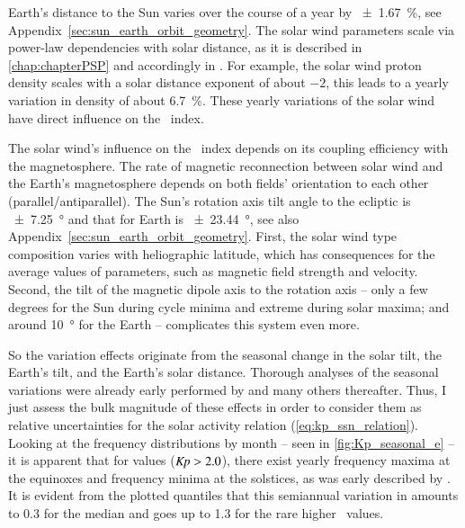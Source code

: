 Earth's distance to the Sun varies over the course of a year by \SI{+-1.67}{\percent}, see Appendix~\ref{sec:sun_earth_orbit_geometry}. The solar wind parameters scale via power-law dependencies with solar distance, as it is described in \autoref{chap:chapterPSP} and accordingly in \citet{Venzmer2018}. For example, the solar wind proton density scales with a solar distance exponent of about $-2$, this leads to a yearly variation in density of about \SI{6.7}{\percent}. These yearly variations of the solar wind have direct influence on the \Kp~index.

The solar wind's influence on the \Kp~index depends on its coupling efficiency with the magnetosphere. The rate of magnetic reconnection between solar wind and the Earth's magnetosphere depends on both fields' orientation to each other (parallel/antiparallel). The Sun's rotation axis tilt angle to the ecliptic is \SI{+-7.25}{\degree} and that for Earth is \SI{+-23.44}{\degree}, see also Appendix~\ref{sec:sun_earth_orbit_geometry}. First, the solar wind type composition varies with heliographic latitude, which has consequences for the average values of parameters, such as magnetic field strength and velocity. Second, the tilt of the magnetic dipole axis to the rotation axis -- only a few degrees for the Sun during cycle minima and extreme during solar maxima; and around \SI{10}{\degree} for the Earth -- complicates this system even more.

So the \Kp{} variation effects originate from the seasonal change in the solar tilt, the Earth's tilt, and the Earth's solar distance. Thorough analyses of the seasonal variations were already early performed by \citet{Cortie1912} and many others thereafter. Thus, I just assess the bulk magnitude of these effects in order to consider them as relative uncertainties for the solar activity relation (\ref{eq:kp_ssn_relation}). Looking at the \Kp{} frequency distributions by month -- seen in \autoref{fig:Kp_seasonal_e} -- it is apparent that for values ($\textit{Kp}{} > 2.0$), there exist yearly frequency maxima at the equinoxes and frequency minima at the solstices, as was early described by \citet{Cortie1912}. It is evident from the plotted quantiles that this semiannual variation in \Kp{} amounts to \num{0.3} for the median \Kp{} and goes up to \num{1.3} for the rare higher \Kp~values.


